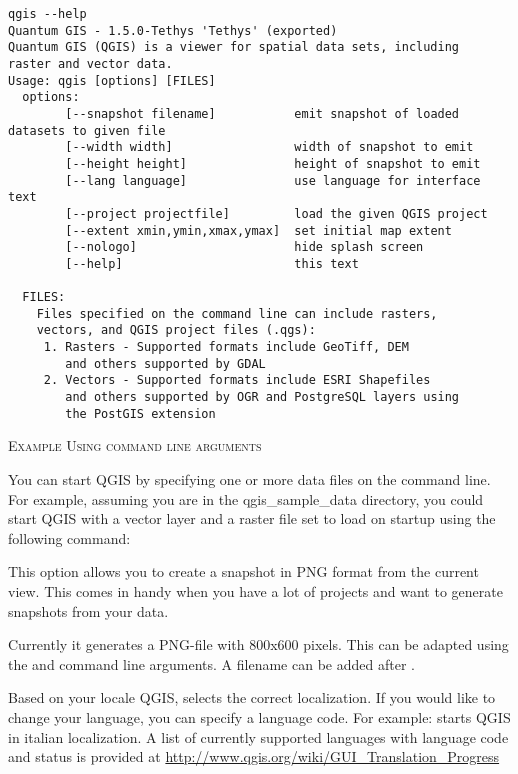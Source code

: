 \small
\begin{verbatim}
qgis --help
Quantum GIS - 1.5.0-Tethys 'Tethys' (exported)
Quantum GIS (QGIS) is a viewer for spatial data sets, including
raster and vector data.
Usage: qgis [options] [FILES]
  options:
        [--snapshot filename]           emit snapshot of loaded datasets to given file
        [--width width]                 width of snapshot to emit
        [--height height]               height of snapshot to emit
        [--lang language]               use language for interface text
        [--project projectfile]         load the given QGIS project
        [--extent xmin,ymin,xmax,ymax]  set initial map extent
        [--nologo]                      hide splash screen
        [--help]                        this text

  FILES:
    Files specified on the command line can include rasters,
    vectors, and QGIS project files (.qgs):
     1. Rasters - Supported formats include GeoTiff, DEM
        and others supported by GDAL
     2. Vectors - Supported formats include ESRI Shapefiles
        and others supported by OGR and PostgreSQL layers using
        the PostGIS extension
\end{verbatim}
\normalsize

\begin{Tip} \caption{\textsc{Example Using command line arguments}}
You can start QGIS by specifying one or more data files
on the command line. For example, assuming you are in the 
qgis\_sample\_data directory, you could start QGIS with a vector layer 
and a raster file set to load on startup using the following command: 
\end{Tip}

This option allows you to create a snapshot in PNG format from the current view.
This comes in handy when you have a lot of projects and want to 
generate snapshots from your data.

Currently it generates a PNG-file with 800x600 pixels. This can be adapted
using the  and  command line
arguments. A filename can be added after .

Based on your locale QGIS, selects the correct localization. If you would like 
to change your language, you can specify a language code. For example: 
starts QGIS in italian localization. A list of currently supported
languages with language code and status is provided at
\url{http://www.qgis.org/wiki/GUI_Translation_Progress} 

